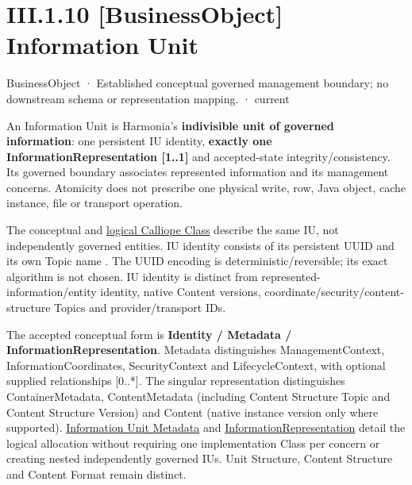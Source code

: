 \section*{III.1.10 [BusinessObject] Information Unit}
\label{navigation:III.1.10}

\label{element:10284034c8534b639284386b064f2c54}
{\small BusinessObject · Established conceptual governed management boundary; no downstream schema or representation mapping. · current}\par

An Information Unit is Harmonia's \textbf{indivisible unit of governed information}:
one persistent IU identity, \textbf{exactly one InformationRepresentation [1..1]} and
accepted-state integrity/consistency. Its governed boundary associates represented
information and its management concerns. Atomicity does not prescribe one physical
write, row, Java object, cache instance, file or transport operation.



The conceptual and \hyperref[element:74ec609de1ae498fbf9d13e4ef8c6cbe]{logical Calliope Class} describe the same
IU, not independently governed entities. IU identity consists of its persistent
UUID and its own Topic name \texttt{}.
The UUID encoding is deterministic/reversible; its exact algorithm is not chosen.
IU identity is distinct from represented-information/entity identity, native Content
versions, coordinate/security/content-structure Topics and provider/transport IDs.



The accepted conceptual form is \textbf{Identity / Metadata / InformationRepresentation}.
Metadata distinguishes ManagementContext, InformationCoordinates, SecurityContext
and LifecycleContext, with optional supplied relationships [0..*]. The singular
representation distinguishes ContainerMetadata, ContentMetadata (including Content
Structure Topic and Content Structure Version) and Content (native instance version
only where supported). \hyperref[element:c05b7e37278141488ecc90b9a9ef96eb]{Information Unit Metadata} and
\hyperref[element:b9891b88150840ada3daefdec6f26c35]{InformationRepresentation} detail the logical allocation without requiring
one implementation Class per concern or creating nested independently governed IUs.
Unit Structure, Content Structure and Content Format remain distinct.



